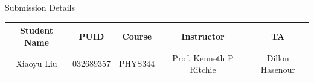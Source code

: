 
\begin{table}[H]
	\centering
	Submission Details
	
	\begin{tabular}{|c|c|c|c|c|}
		\hline
		Student Name & PUID & Course & Instructor & TA\\
		\hline
		Xiaoyu Liu & 032689357 & PHYS344 & Prof. Kenneth P Ritchie & Dillon Hasenour\\
		\hline
	\end{tabular}
\end{table}
